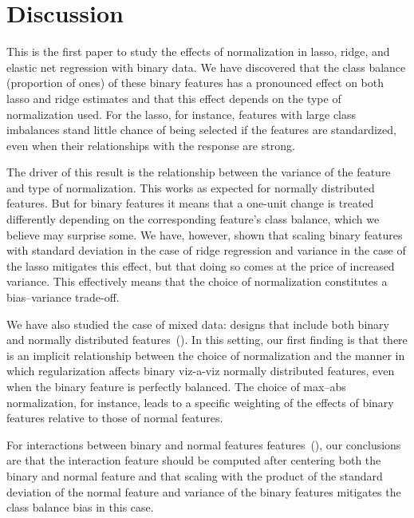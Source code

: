 \section{Discussion}


This is the first paper to study the effects of normalization in lasso, ridge, and elastic
net regression with binary data. We have discovered that the class balance (proportion of
ones) of these binary features has a pronounced effect on both lasso and ridge estimates
and that this effect depends on the type of normalization used. For the lasso, for
instance, features with large class imbalances stand little chance of being selected if the
features are standardized, even when their relationships with the response are strong.

The driver of this result is the relationship between the variance of the feature and type
of normalization. This works as expected for normally distributed features. But for binary
features it means that a one-unit change is treated differently depending on the
corresponding feature's class balance, which we believe may surprise some. We have,
however, shown that scaling binary features with standard deviation in the case of ridge
regression and variance in the case of the lasso mitigates this effect, but that doing so
comes at the price of increased variance. This effectively means that the choice of
normalization constitutes a bias--variance trade-off.

We have also studied the case of mixed data: designs that include both binary and normally
distributed features~(). In this setting, our first finding is that
there is an implicit relationship between the choice of normalization and the manner in
which regularization affects binary viz-a-viz normally distributed features, even when the
binary feature is perfectly balanced. The choice of max--abs normalization, for instance,
leads to a specific weighting of the effects of binary features relative to those of normal
features.

For interactions between binary and normal features
features~(), our conclusions are that the interaction
feature should be computed after centering both the binary and normal feature and that
scaling with the product of the standard deviation of the normal feature and variance of
the binary features mitigates the class balance bias in this case.

